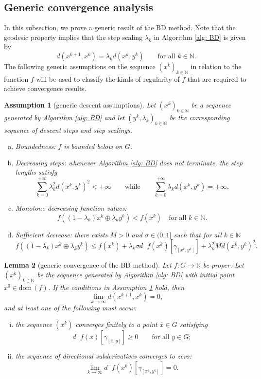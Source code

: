 \documentclass{article}
\theoremstyle{plain}\newtheorem{theorem}{Theorem}[section]
\theoremstyle{plain}\newtheorem{definition}[theorem]{Definition}
\theoremstyle{plain}\newtheorem{lemma}[theorem]{Lemma}
\theoremstyle{definition}\newtheorem{remark}[theorem]{Remark}
\theoremstyle{definition}\newtheorem{example}[theorem]{Example}
\theoremstyle{plain}\newtheorem{proposition}[theorem]{Proposition}
\theoremstyle{plain}\newtheorem{inference}[theorem]{Inference}
\theoremstyle{plain}\newtheorem{corollary}[theorem]{Corollary}
\theoremstyle{plain}\newtheorem{assumption}[theorem]{Assumption}
\newcommand{\extre}{\overline{\mathbb{R}}}
\newcommand{\xbar}{\bar{x}}
\newcommand{\bbN}{\mathbb{N}}
\newcommand{\Nbb}{\mathbb{N}}
\begin{document}
\subsection{Generic convergence analysis}\label{s:gen convergence}
In this subsection, we prove a generic result of the BD method. Note that the geodesic property implies that the step scaling $\lambda_k$ in Algorithm \ref{alg: BD} is given by
$$
d(x^{k+1},x^k)=\lambda_k d(x^k,y^k) \qquad\text{for all}\,\,k\in\Nbb.
$$
The following generic assumptions on the sequence $(x^k)_{k\in\bbN}$ in relation to the function $f$ will be used to classify the kinds of regularity of $f$ that are required to achieve convergence results.
\begin{assumption}[generic descent assumptions]\label{as: gen assm}
    Let $(x^k)_{k\in\bbN}$ be a sequence generated by Algorithm \ref{alg: BD} and let $(y^k,\lambda_k)_{k\in\bbN}$ be the corresponding sequence of descent steps and step scalings.
    \begin{enumerate}[(a)]
        \item\label{as: gen assm bbb} Boundedness: $f$ is bounded below on $G$.
        \item\label{as: gen assm ds} Decreasing steps: whenever Algorithm \ref{alg: BD} does not terminate,
        the step lengths satisfy
        $$
        \sum_{k=0}^{+\infty}\lambda^2_kd(x^k, y^k)^2<+\infty \qquad\text{while}\qquad \sum_{k=0}^{+\infty}\lambda_kd(x^k, y^k)=+\infty.
        $$
        \item\label{as: gen assm mdfv} Monotone decreasing function values:
        $$
        f((1-\lambda_k)x^k\oplus\lambda_k y^k)<f(x^k) \quad \text{for all}\,\,k\in\bbN.
        $$
        \item\label{as: gen assm sd} Sufficient decrease: there exists $M>0$ and $\sigma\in(0,1]$ such that for all $k\in\bbN$
        $$
        f((1-\lambda_k)x^k\oplus\lambda_k y^k)\leq f(x^k)+\lambda_k \sigma d^-f(x^k)[\gamma_{[x^k, y^k]}]+\lambda_k^2 Md(x^k, y^k)^2.
        $$
    \end{enumerate}
\end{assumption}
\begin{lemma}[generic convergence of the BD method]\label{lm: proto descent}
    Let $f:G\to\extre$ be proper. Let $(x^k)_{k\in\bbN}$ be the sequence generated by Algorithm \ref{alg: BD} with initial point $x^0\in\mathrm{dom}\,(f)$. If the conditions in Assumption \ref{as: gen assm} hold, then
    $$
    \lim_{k\to\infty}d(x^{k+1},x^k)=0,
    $$
    and at least one of the following must occur:
    \begin{enumerate}[(i)]
        \item\label{lm: proto descent a} the sequence $(x^k)$ converges finitely to a point $\xbar\in G$ satisfying
        $$
        d^-f(\xbar)[\gamma_{[\xbar, y]}]\geq 0 \qquad\text{for all}\,\,y\in G;
        $$
        \item\label{lm: proto descent b} the sequence of directional subderivatives converges to zero:
        $$
        \lim_{k\to\infty} d^-f(x^k)[\gamma_{[x^k, y^k]}]=0.
        $$
    \end{enumerate}
\end{lemma}
\end{document}
